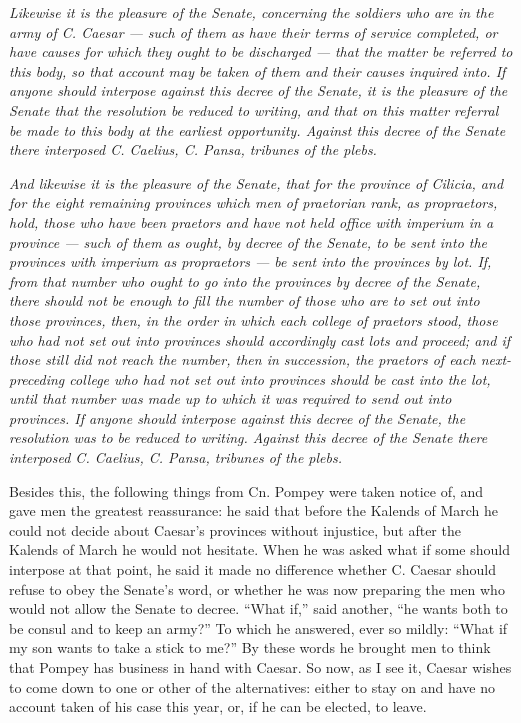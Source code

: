 \textit{Likewise it is the pleasure of the Senate, concerning the soldiers who are in the army of C. Caesar --- such of them as have their terms of service completed, or have causes for which they ought to be discharged --- that the matter be referred to this body, so that account may be taken of them and their causes inquired into. If anyone should interpose against this decree of the Senate, it is the pleasure of the Senate that the resolution be reduced to writing, and that on this matter referral be made to this body at the earliest opportunity. Against this decree of the Senate there interposed C. Caelius, C. Pansa, tribunes of the plebs.}

 \textit{And likewise it is the pleasure of the Senate, that for the province of Cilicia, and for the eight remaining provinces which men of praetorian rank, as propraetors, hold, those who have been praetors and have not held office with imperium in a province --- such of them as ought, by decree of the Senate, to be sent into the provinces with imperium as propraetors --- be sent into the provinces by lot. If, from that number who ought to go into the provinces by decree of the Senate, there should not be enough to fill the number of those who are to set out into those provinces, then, in the order in which each college of praetors stood, those who had not set out into provinces should accordingly cast lots and proceed; and if those still did not reach the number, then in succession, the praetors of each next-preceding college who had not set out into provinces should be cast into the lot, until that number was made up to which it was required to send out into provinces. If anyone should interpose against this decree of the Senate, the resolution was to be reduced to writing. Against this decree of the Senate there interposed C. Caelius, C. Pansa, tribunes of the plebs.}

 Besides this, the following things from Cn. Pompey were taken notice of, and gave men the greatest reassurance: he said that before the Kalends of March he could not decide about Caesar's provinces without injustice, but after the Kalends of March he would not hesitate. When he was asked what if some should interpose at that point, he said it made no difference whether C. Caesar should refuse to obey the Senate's word, or whether he was now preparing the men who would not allow the Senate to decree. ``What if,'' said another, ``he wants both to be consul and to keep an army?'' To which he answered, ever so mildly: ``What if my son wants to take a stick to me?'' By these words he brought men to think that Pompey has business in hand with Caesar. So now, as I see it, Caesar wishes to come down to one or other of the alternatives: either to stay on and have no account taken of his case this year, or, if he can be elected, to leave.


